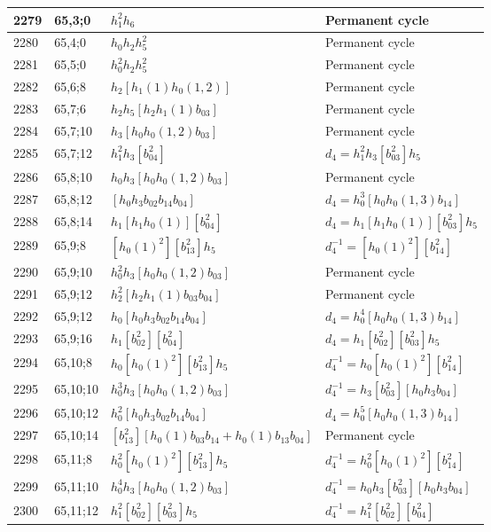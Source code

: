 \documentclass{article}
\begin{document}
\begin{longtable}{|l|l|>{\raggedright\arraybackslash}p{6cm}|>{\raggedright\arraybackslash}p{6cm}|}
2279 & 65,3;0 & $h_1^2h_6$ & Permanent cycle\\
\hline
2280 & 65,4;0 & $h_0h_2h_5^2$ & Permanent cycle\\
\hline
2281 & 65,5;0 & $h_0^2h_2h_5^2$ & Permanent cycle\\
\hline
2282 & 65,6;8 & $h_2[h_1(1)h_0(1, 2)]$ & Permanent cycle\\
\hline
2283 & 65,7;6 & $h_2h_5[h_2h_1(1)b_{03}]$ & Permanent cycle\\
\hline
2284 & 65,7;10 & $h_3[h_0h_0(1, 2)b_{03}]$ & Permanent cycle\\
\hline
2285 & 65,7;12 & $h_1^2h_3[b_{04}^2]$ &$d_{4}=h_1^2h_3[b_{03}^2]h_5$\\
\hline
2286 & 65,8;10 & $h_0h_3[h_0h_0(1, 2)b_{03}]$ & Permanent cycle\\
\hline
2287 & 65,8;12 & $[h_0h_3b_{02}b_{14}b_{04}]$ &$d_{4}=h_0^3[h_0h_0(1, 3)b_{14}]$\\
\hline
2288 & 65,8;14 & $h_1[h_1h_0(1)][b_{04}^2]$ &$d_{4}=h_1[h_1h_0(1)][b_{03}^2]h_5$\\
\hline
2289 & 65,9;8 & $[h_0(1)^2][b_{13}^2]h_5$ & $d_{4}^{-1}=[h_0(1)^2][b_{14}^2]$\\
\hline
2290 & 65,9;10 & $h_0^2h_3[h_0h_0(1, 2)b_{03}]$ & Permanent cycle\\
\hline
2291 & 65,9;12 & $h_2^2[h_2h_1(1)b_{03}b_{04}]$ & Permanent cycle\\
2292 & 65,9;12 & $h_0[h_0h_3b_{02}b_{14}b_{04}]$ &$d_{4}=h_0^4[h_0h_0(1, 3)b_{14}]$\\
\hline
2293 & 65,9;16 & $h_1[b_{02}^2][b_{04}^2]$ &$d_{4}=h_1[b_{02}^2][b_{03}^2]h_5$\\
\hline
2294 & 65,10;8 & $h_0[h_0(1)^2][b_{13}^2]h_5$ & $d_{4}^{-1}=h_0[h_0(1)^2][b_{14}^2]$\\
\hline
2295 & 65,10;10 & $h_0^3h_3[h_0h_0(1, 2)b_{03}]$ & $d_{4}^{-1}=h_3[b_{03}^2][h_0h_3b_{04}]$\\
\hline
2296 & 65,10;12 & $h_0^2[h_0h_3b_{02}b_{14}b_{04}]$ &$d_{4}=h_0^5[h_0h_0(1, 3)b_{14}]$\\
\hline
2297 & 65,10;14 & $[b_{13}^2][h_0(1)b_{03}b_{14} + h_0(1)b_{13}b_{04}]$ & Permanent cycle\\
\hline
2298 & 65,11;8 & $h_0^2[h_0(1)^2][b_{13}^2]h_5$ & $d_{4}^{-1}=h_0^2[h_0(1)^2][b_{14}^2]$\\
\hline
2299 & 65,11;10 & $h_0^4h_3[h_0h_0(1, 2)b_{03}]$ & $d_{4}^{-1}=h_0h_3[b_{03}^2][h_0h_3b_{04}]$\\
\hline
2300 & 65,11;12 & $h_1^2[b_{02}^2][b_{03}^2]h_5$ & $d_{4}^{-1}=h_1^2[b_{02}^2][b_{04}^2]$\\

\end{longtable}
\end{document}
